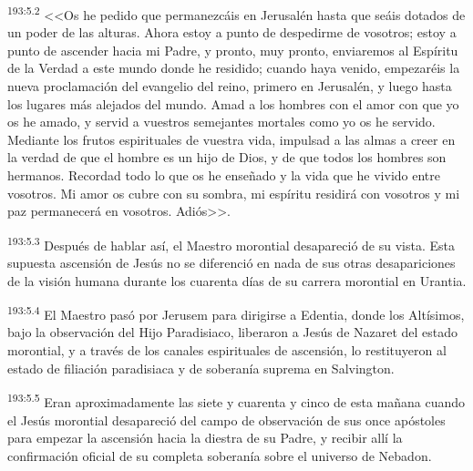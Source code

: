 \par 
\textsuperscript{193:5.2} <<Os he pedido que permanezcáis en Jerusalén hasta que seáis dotados de un poder de las alturas. Ahora estoy a punto de despedirme de vosotros; estoy a punto de ascender hacia mi Padre, y pronto, muy pronto, enviaremos al Espíritu de la Verdad a este mundo donde he residido; cuando haya venido, empezaréis la nueva proclamación del evangelio del reino, primero en Jerusalén, y luego hasta los lugares más alejados del mundo. Amad a los hombres con el amor con que yo os he amado, y servid a vuestros semejantes mortales como yo os he servido. Mediante los frutos espirituales de vuestra vida, impulsad a las almas a creer en la verdad de que el hombre es un hijo de Dios, y de que todos los hombres son hermanos. Recordad todo lo que os he enseñado y la vida que he vivido entre vosotros. Mi amor os cubre con su sombra, mi espíritu residirá con vosotros y mi paz permanecerá en vosotros. Adiós>>.

\par 
\textsuperscript{193:5.3} Después de hablar así, el Maestro morontial desapareció de su vista. Esta supuesta ascensión de Jesús no se diferenció en nada de sus otras desapariciones de la visión humana durante los cuarenta días de su carrera morontial en Urantia.

\par 
\textsuperscript{193:5.4} El Maestro pasó por Jerusem para dirigirse a Edentia, donde los Altísimos, bajo la observación del Hijo Paradisiaco, liberaron a Jesús de Nazaret del estado morontial, y a través de los canales espirituales de ascensión, lo restituyeron al estado de filiación paradisiaca y de soberanía suprema en Salvington.

\par 
\textsuperscript{193:5.5} Eran aproximadamente las siete y cuarenta y cinco de esta mañana cuando el Jesús morontial desapareció del campo de observación de sus once apóstoles para empezar la ascensión hacia la diestra de su Padre, y recibir allí la confirmación oficial de su completa soberanía sobre el universo de Nebadon.

